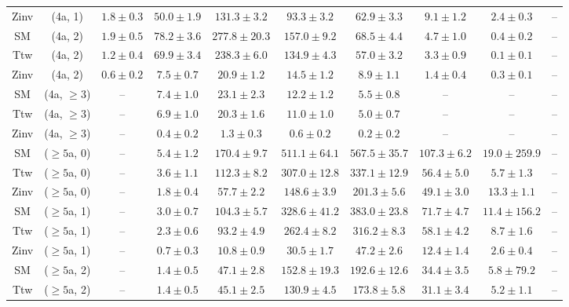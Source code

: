 \begin{table}[h!]
{\begin{tabular}{cccccccccc}
	Zinv & (4a, 1) & $1.8\pm 0.3$ & $50.0\pm 1.9$ & $131.3\pm 3.2$ & $93.3\pm 3.2$ & $62.9\pm 3.3$ & $9.1\pm 1.2$ & $2.4\pm 0.3$ & -- \\[0.5ex] 
	SM & (4a, 2) & $1.9\pm 0.5$ & $78.2\pm 3.6$ & $277.8\pm 20.3$ & $157.0\pm 9.2$ & $68.5\pm 4.4$ & $4.7\pm 1.0$ & $0.4\pm 0.2$ & -- \\[0.5ex] 
	Ttw & (4a, 2) & $1.2\pm 0.4$ & $69.9\pm 3.4$ & $238.3\pm 6.0$ & $134.9\pm 4.3$ & $57.0\pm 3.2$ & $3.3\pm 0.9$ & $0.1\pm 0.1$ & -- \\[0.5ex] 
	Zinv & (4a, 2) & $0.6\pm 0.2$ & $7.5\pm 0.7$ & $20.9\pm 1.2$ & $14.5\pm 1.2$ & $8.9\pm 1.1$ & $1.4\pm 0.4$ & $0.3\pm 0.1$ & -- \\[0.5ex] 
	SM & (4a, $\ge3$) & -- & $7.4\pm 1.0$ & $23.1\pm 2.3$ & $12.2\pm 1.2$ & $5.5\pm 0.8$ & -- & -- & -- \\[0.5ex] 
	Ttw & (4a, $\ge3$) & -- & $6.9\pm 1.0$ & $20.3\pm 1.6$ & $11.0\pm 1.0$ & $5.0\pm 0.7$ & -- & -- & -- \\[0.5ex] 
	Zinv & (4a, $\ge3$) & -- & $0.4\pm 0.2$ & $1.3\pm 0.3$ & $0.6\pm 0.2$ & $0.2\pm 0.2$ & -- & -- & -- \\[0.5ex] 
	SM & ($\ge5$a, 0) & -- & $5.4\pm 1.2$ & $170.4\pm 9.7$ & $511.1\pm 64.1$ & $567.5\pm 35.7$ & $107.3\pm 6.2$ & $19.0\pm 259.9$ & -- \\[0.5ex] 
	Ttw & ($\ge5$a, 0) & -- & $3.6\pm 1.1$ & $112.3\pm 8.2$ & $307.0\pm 12.8$ & $337.1\pm 12.9$ & $56.4\pm 5.0$ & $5.7\pm 1.3$ & -- \\[0.5ex] 
	Zinv & ($\ge5$a, 0) & -- & $1.8\pm 0.4$ & $57.7\pm 2.2$ & $148.6\pm 3.9$ & $201.3\pm 5.6$ & $49.1\pm 3.0$ & $13.3\pm 1.1$ & -- \\[0.5ex] 
	SM & ($\ge5$a, 1) & -- & $3.0\pm 0.7$ & $104.3\pm 5.7$ & $328.6\pm 41.2$ & $383.0\pm 23.8$ & $71.7\pm 4.7$ & $11.4\pm 156.2$ & -- \\[0.5ex] 
	Ttw & ($\ge5$a, 1) & -- & $2.3\pm 0.6$ & $93.2\pm 4.9$ & $262.4\pm 8.2$ & $316.2\pm 8.3$ & $58.1\pm 4.2$ & $8.7\pm 1.6$ & -- \\[0.5ex] 
	Zinv & ($\ge5$a, 1) & -- & $0.7\pm 0.3$ & $10.8\pm 0.9$ & $30.5\pm 1.7$ & $47.2\pm 2.6$ & $12.4\pm 1.4$ & $2.6\pm 0.4$ & -- \\[0.5ex] 
	SM & ($\ge5$a, 2) & -- & $1.4\pm 0.5$ & $47.1\pm 2.8$ & $152.8\pm 19.3$ & $192.6\pm 12.6$ & $34.4\pm 3.5$ & $5.8\pm 79.2$ & -- \\[0.5ex] 
	Ttw & ($\ge5$a, 2) & -- & $1.4\pm 0.5$ & $45.1\pm 2.5$ & $130.9\pm 4.5$ & $173.8\pm 5.8$ & $31.1\pm 3.4$ & $5.2\pm 1.1$ & -- \\[0.5ex] 

\end{tabular}}
\end{table}
